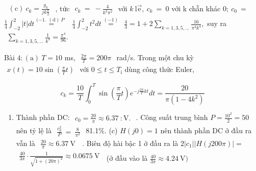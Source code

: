 \documentclass[
  10
]{article}
\providecommand{\tightlist}{%
  \setlength{\itemsep}{0pt}\setlength{\parskip}{0pt}}
\begin{document}
\(\begin{array} { r } { \mathrm { ~ ( c ) ~ } c _ { k } = \frac { g _ { k } } { j k \frac { \pi } { 2 } } } \end{array}\)
, tức
\(\begin{array} { r } { c _ { k } \ = \ - \frac { 4 } { k ^ { 2 } \pi ^ { 2 } } } \end{array}\)
với \(k \ \mathrm { l { \vec { e } } } , \ c _ { k } \ = \ 0\) với k
chẵn khác \(0 ; \ c _ { 0 } \ =\)
\(\textstyle { \frac { 1 } { 4 } } \int _ { - 2 } ^ { 2 } | t | d t \stackrel { \textstyle { ( - 1 . \mathrm {  ~ \scriptstyle ~ ( d ) ~ } } P \enspace } { = } \enspace \frac { 1 } { 4 } \int _ { - 2 } ^ { 2 } t ^ { 2 } d t \stackrel { \textstyle { ( - 1 ) } } { = } \enspace \frac { 4 } { 3 } = 1 + 2 \sum _ { k = 1 , 3 , 5 , . . . } \frac { 1 6 } { \pi ^ { 4 } k ^ { 4 } } ,\)
suy ra
\(\begin{array} { r } { \sum _ { k = 1 , 3 , 5 , . . . } \frac { 1 } { k ^ { 4 } } = \frac { \pi ^ { 4 } } { 9 6 } . } \end{array}\)

Bài \(4 \colon ( \mathrm { a } ) ~ T = 1 0\) ms,
\(\begin{array} { r } { \frac { 2 \pi } { T } = 2 0 0 \pi } \end{array}\)
rad/s. Trong một chu kỳ
\(\begin{array} { r } { x ( t ) = 1 0 \sin ( \frac { \pi } { T } t ) } \end{array}\)
với \(0 \leq t \leq T _ { \mathrm { { i } } }\) dùng công thức Euler,

\[
c _ {k} = \frac {1 0}{T} \int_ {0} ^ {T} \sin \left(\frac {\pi}{T} t\right) e ^ {- j \frac {2 \pi}{T} k t} d t = \frac {2 0}{\pi (1 - 4 k ^ {2})}
\]

\begin{enumerate}
\def\labelenumi{(\alph{enumi})}
\setcounter{enumi}{1}
\tightlist
\item
  Thành phần DC:
  \(\begin{array} { r } { c _ { 0 } = \frac { 2 0 } { \pi } \approx 6 . 3 7 \ : \mathrm { V } . } \end{array}\)
  . Công suất trung bình
  \(\textstyle P = { \frac { 1 0 ^ { 2 } } { 2 } } = 5 0\) nên tỷ lệ là
  \(\begin{array} { r } { \frac { c _ { 0 } ^ { 2 } } { P } \ = \ \frac { 8 } { \pi ^ { 2 } } } \end{array}\)
  81.1\%. (c) \(H ( j 0 ) = 1\) nên thành phần DC ở đầu ra vẫn là
  \(\begin{array} { r } { \frac { 2 0 } { \pi } \approx 6 . 3 7 \mathrm { ~ V ~ } } \end{array}\)
  . Biên độ hài bậc 1 ở đầu ra là
  \(2 | c _ { 1 } | | H ( j 2 0 0 \pi ) | =\)
  \(\begin{array} { r } { \frac { 4 0 } { 3 \pi } \cdot \frac { 1 } { \sqrt { 1 + ( 2 0 \pi ) ^ { 2 } } } \approx 0 . 0 6 7 5 \mathrm { ~ V ~ } } \end{array}\)
  (ở đầu vào là
  \(\textstyle { \frac { 4 0 } { 3 \pi } } \approx 4 . 2 4 { \mathrm { ~ V } } )\)
\end{enumerate}
\end{document}
